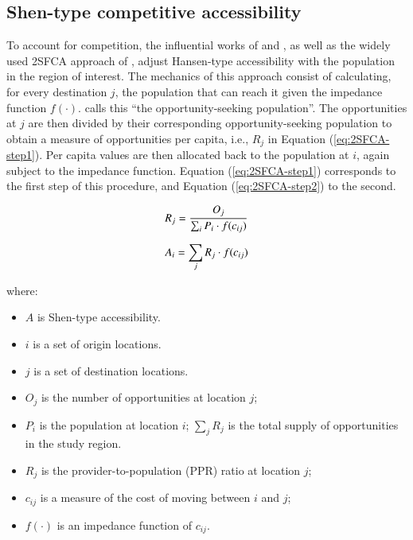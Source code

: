 \documentclass[]{elsarticle} %
\providecommand{\tightlist}{%
  \setlength{\itemsep}{0pt}\setlength{\parskip}{0pt}}
\begin{document}
\hypertarget{shen-type-competitive-accessibility}{%
\subsection{Shen-type competitive
accessibility}\label{shen-type-competitive-accessibility}}

To account for competition, the influential works of \citet{shen1998}
and \citet{weibull_axiomatic_1976}, as well as the widely used 2SFCA
approach of \citet{luo2003}, adjust Hansen-type accessibility with the
population in the region of interest. The mechanics of this approach
consist of calculating, for every destination \(j\), the population that
can reach it given the impedance function \(f(\cdot)\). \citet{shen1998}
calls this ``the opportunity-seeking population''. The opportunities at
\(j\) are then divided by their corresponding opportunity-seeking
population to obtain a measure of opportunities per capita, i.e.,
\(R_j\) in Equation (\ref{eq:2SFCA-step1}). Per capita values are then
allocated back to the population at \(i\), again subject to the
impedance function. Equation (\ref{eq:2SFCA-step1}) corresponds to the
first step of this procedure, and Equation (\ref{eq:2SFCA-step2}) to the
second.

\begin{equation}
\label{eq:2SFCA-step1}
R_{j} = \frac{O_{j}}{\sum_i P_{i} \cdot f(c_{ij})}\\
\end{equation}

\begin{equation}
\label{eq:2SFCA-step2}
A_{i} = {\sum_j R_{j} \cdot f(c_{ij})}\\
\end{equation}

\noindent where:

\begin{itemize}
\tightlist
\item
  \(A\) is Shen-type accessibility.
\item
  \(i\) is a set of origin locations.
\item
  \(j\) is a set of destination locations.
\item
  \(O_j\) is the number of opportunities at location \(j\);
\item
  \(P_i\) is the population at location \(i\); \(\sum_j R_j\) is the
  total supply of opportunities in the study region.
\item
  \(R_j\) is the provider-to-population (PPR) ratio at location \(j\);
\item
  \(c_{ij}\) is a measure of the cost of moving between \(i\) and \(j\);
\item
  \(f(\cdot)\) is an impedance function of \(c_{ij}\).
\end{itemize}
\end{document}
